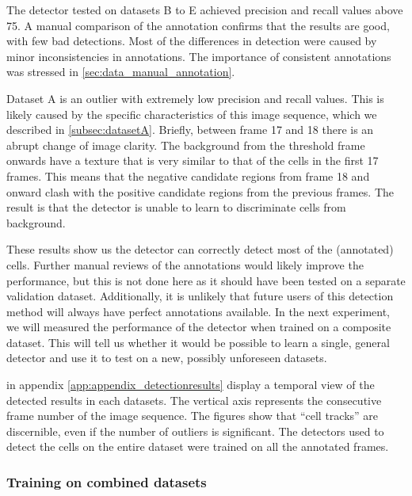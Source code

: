 		The detector tested on datasets B to E achieved precision and recall values above 75. A manual comparison of the annotation confirms that the results are good, with few bad detections. Most of the differences in detection were caused by minor inconsistencies in annotations. The importance of consistent annotations was stressed in \cref{sec:data_manual_annotation}.
		
		Dataset A is an outlier with extremely low precision and recall values. This is likely caused by the specific characteristics of this image sequence, which we described in \cref{subsec:datasetA}. Briefly, between frame 17 and 18 there is an abrupt change of image clarity. The background from the threshold frame onwards have a texture that is very similar to that of the cells in the first 17 frames. This means that the negative candidate regions from frame 18 and onward clash with the positive candidate regions from the previous frames. The result is that the detector is unable to learn to discriminate cells from background.
		
		These results show us the detector can correctly detect most of the (annotated) cells. Further manual reviews of the annotations would likely improve the performance, but this is not done here as it should have been tested on a separate validation dataset. Additionally, it is unlikely that future users of this detection method will always have perfect annotations available. In the next experiment, we will measured the performance of the detector when trained on a composite dataset. This will tell us whether it would be possible to learn a single, general detector and use it to test on a new, possibly unforeseen datasets.

		 in appendix \ref{app:appendix_detectionresults} display a temporal view of the detected results in each datasets. The vertical axis represents the consecutive frame number of the image sequence. The figures show that ``cell tracks'' are discernible, even if the number of outliers is significant. The detectors used to detect the cells on the entire dataset were trained on all the annotated frames.

		\subsubsection{Training on combined datasets}
		
